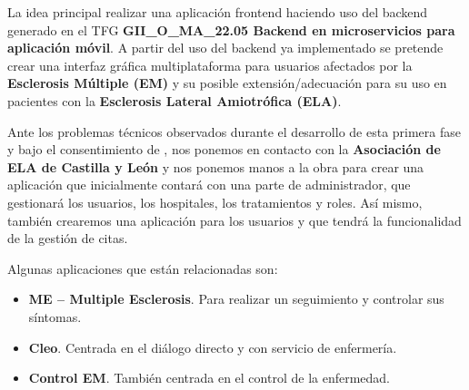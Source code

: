 
La idea principal realizar una aplicación frontend haciendo uso del backend generado en el TFG \textbf{GII\_O\_MA\_22.05 Backend en microservicios para aplicación móvil}. A partir del uso del backend ya implementado se pretende crear una interfaz gráfica multiplataforma para usuarios afectados por la \textbf{Esclerosis Múltiple (EM)} y su posible extensión/adecuación para su uso en pacientes con la \textbf{Esclerosis Lateral Amiotrófica (ELA)}.

Ante los problemas técnicos observados durante el desarrollo de esta primera fase y bajo el consentimiento de \nomtutor, nos ponemos en contacto con la \textbf{Asociación de ELA de Castilla y León} y nos ponemos manos a la obra para crear una aplicación que inicialmente contará con una parte de administrador, que gestionará los usuarios, los hospitales, los tratamientos y roles. Así mismo, también crearemos una aplicación para los usuarios y que tendrá la funcionalidad de la gestión de citas. 

Algunas aplicaciones que están relacionadas son:
\begin{itemize}
\item \textbf{ME -- Multiple Esclerosis}. Para realizar un seguimiento y controlar sus síntomas.
\item \textbf{Cleo}. Centrada en el diálogo directo y con servicio de enfermería.
\item \textbf{Control EM}. También centrada en el control de la enfermedad.
\end{itemize}
